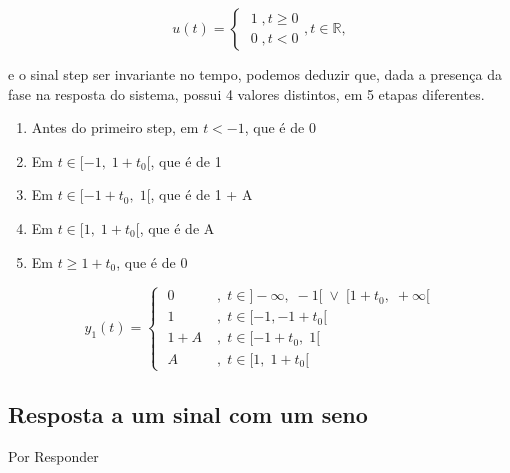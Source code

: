 \documentclass[12pt,a4paper]{article}
\begin{document}
\begin{equation}
	u(t) = 
	\begin{cases}
		\; 1 \;, t \geq 0 \\
		\; 0 \;, t < 0
	\end{cases}
	, t \in \mathbb{R},
\end{equation}

e o sinal step ser invariante no tempo, podemos deduzir que, dada a presença da
fase na resposta do sistema, possui 4 valores distintos, em 5 etapas diferentes.

\begin{enumerate}
	\item Antes do primeiro step, em $t < -1$, que é de 0
	\item Em $t \in [-1, \; 1 + t_0[$, que é de 1
	\item Em $t \in [-1 + t_0, \; 1[$, que é de 1 + A
	\item Em $t \in [1, \; 1 + t_0[$, que é de A
	\item Em $t \geq 1 + t_0$, que é de 0
\end{enumerate}

\begin{equation}
	y_1(t) = 
	\begin{cases}
		\; 0 \;   &, \; t \in ]-\infty,\; -1[ \; \vee \;[1 + t_0, \; + \infty [\\
		\; 1 \;   &, \; t \in [-1, -1 + t_0[ \\
		\; 1+A\;  &, \; t \in [-1 + t_0, \; 1[ \\
		\; A \;   &, \; t \in [1, \; 1 + t_0[
	\end{cases}
\end{equation}

\newpage
\subsection{Resposta a um sinal com um seno}
Por Responder
\end{document}
